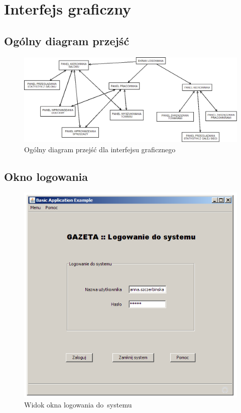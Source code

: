\section{Interfejs graficzny}
\subsection{Ogólny diagram przejść}
\begin{figure}
\includegraphics[width=1\textwidth]{gfx/diagram_przejsc.png}
\caption{Ogólny diagram przejść dla interfejsu graficznego}
\end{figure}
\subsection{Okno logowania}
\begin{figure}
\includegraphics[width=1\textwidth]{gfx/logowanie.png}
\caption{Widok okna logowania do~systemu}
\end{figure}
